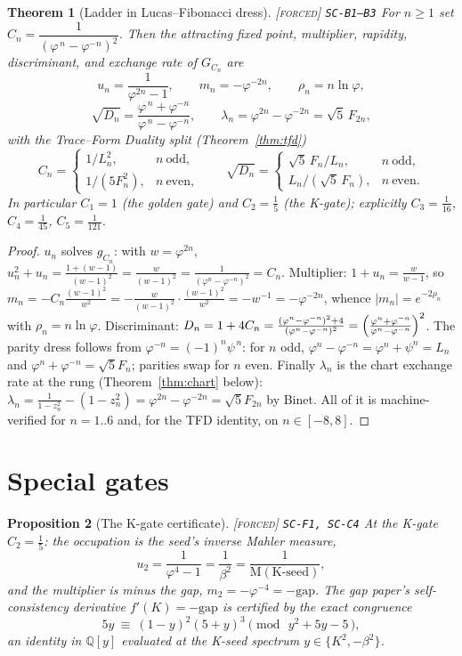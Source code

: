 \documentclass[11pt]{article}
\newcommand{\tagF}{\textcolor{cF}{\textsc{[forced]}}}
\newcommand{\hx}[1]{\textcolor{cC}{\footnotesize\texttt{#1}}}
\newcommand{\Q}{\mathbb{Q}}
\newcommand{\gp}{\varphi}
\newcommand{\gq}{\psi}
\newcommand{\gapc}{\mathrm{gap}}
\newcommand{\M}{\mathrm{M}}
\theoremstyle{plain}
\newtheorem{theorem}{Theorem}[section]
\newtheorem{proposition}[theorem]{Proposition}
\theoremstyle{definition}
\theoremstyle{remark}
\begin{document}
\begin{theorem}[Ladder in Lucas--Fibonacci dress]\label{thm:ladder}\tagF{} \hx{SC-B1--B3}
For $n\ge1$ set $C_n=\dfrac{1}{(\gp^{\,n}-\gp^{-n})^2}$. Then the attracting fixed
point, multiplier, rapidity, discriminant, and exchange rate of $G_{C_n}$ are
\[
u_n=\frac{1}{\gp^{2n}-1},\qquad
m_n=-\gp^{-2n},\qquad
\rho_n=n\ln\gp,
\]
\[
\sqrt{D_n}=\frac{\gp^{\,n}+\gp^{-n}}{\gp^{\,n}-\gp^{-n}},\qquad
\lambda_n=\gp^{2n}-\gp^{-2n}=\sqrt5\,F_{2n},
\]
with the Trace--Form Duality split (Theorem~\ref{thm:tfd})
\[
C_n=\begin{cases}1/L_n^2,& n\ \text{odd},\\[2pt] 1/(5F_n^2),& n\ \text{even},\end{cases}
\qquad
\sqrt{D_n}=\begin{cases}\sqrt5\,F_n/L_n,& n\ \text{odd},\\[2pt] L_n/(\sqrt5\,F_n),& n\ \text{even}.\end{cases}
\]
In particular $C_1=1$ (the \emph{golden gate}) and $C_2=\tfrac15$ (the \emph{K-gate});
explicitly $C_3=\tfrac1{16}$, $C_4=\tfrac1{45}$, $C_5=\tfrac1{121}$.
\end{theorem}

\begin{proof}
$u_n$ solves $g_{C_n}$: with $w=\gp^{2n}$,
$u_n^2+u_n=\frac{1+(w-1)}{(w-1)^2}=\frac{w}{(w-1)^2}=\frac{1}{(\gp^n-\gp^{-n})^2}=C_n$.
Multiplier: $1+u_n=\frac{w}{w-1}$, so
$m_n=-C_n\frac{(w-1)^2}{w^2}=-\frac{w}{(w-1)^2}\cdot\frac{(w-1)^2}{w^2}=-w^{-1}
=-\gp^{-2n}$, whence $|m_n|=e^{-2\rho_n}$ with $\rho_n=n\ln\gp$. Discriminant:
$D_n=1+4C_n=\frac{(\gp^n-\gp^{-n})^2+4}{(\gp^n-\gp^{-n})^2}
=\Bigl(\frac{\gp^n+\gp^{-n}}{\gp^n-\gp^{-n}}\Bigr)^2$. The parity dress follows from
$\gp^{-n}=(-1)^n\gq^{\,n}$: for $n$ odd, $\gp^n-\gp^{-n}=\gp^n+\gq^n=L_n$ and
$\gp^n+\gp^{-n}=\sqrt5F_n$; parities swap for $n$ even. Finally
$\lambda_n$ is the chart exchange rate at the rung (Theorem~\ref{thm:chart} below):
$\lambda_n=\frac1{1-z_n^2}-(1-z_n^2)=\gp^{2n}-\gp^{-2n}=\sqrt5F_{2n}$ by Binet.
All of it is machine-verified for $n=1..6$ and, for the TFD identity, on
$n\in[-8,8]$.
\end{proof}

\section{Special gates}\label{sec:specialgates}

\begin{proposition}[The K-gate certificate]\label{prop:kgate}\tagF{} \hx{SC-F1, SC-C4}
At the K-gate $C_2=\tfrac15$: the occupation is the seed's inverse Mahler measure,
\[
u_2=\frac{1}{\gp^4-1}=\frac{1}{\beta^2}=\frac{1}{\M(\text{K-seed})},
\]
and the multiplier is minus the gap, $m_2=-\gp^{-4}=-\gapc$. The gap paper's
self-consistency derivative $f'(K)=-\gapc$ is certified by the exact congruence
\[
5y\ \equiv\ (1-y)^2(5+y)^3 \pmod{\,y^2+5y-5\,},
\]
an identity in $\Q[y]$ evaluated at the K-seed spectrum $y\in\{K^2,-\beta^2\}$.
\end{proposition}
\end{document}
